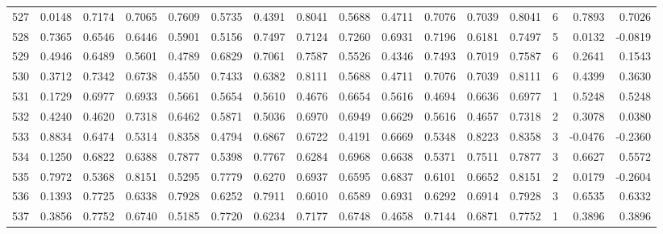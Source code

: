 \begin{tabular}{lrrrrrrrrrrrrrrr}
527 &      0.0148 &  0.7174 &  0.7065 &  0.7609 &  0.5735 &  0.4391 &  0.8041 &  0.5688 &  0.4711 &  0.7076 &   0.7039 &     0.8041 &      6 &                    0.7893 &                     0.7026 \\
528 &      0.7365 &  0.6546 &  0.6446 &  0.5901 &  0.5156 &  0.7497 &  0.7124 &  0.7260 &  0.6931 &  0.7196 &   0.6181 &     0.7497 &      5 &                    0.0132 &                    -0.0819 \\
529 &      0.4946 &  0.6489 &  0.5601 &  0.4789 &  0.6829 &  0.7061 &  0.7587 &  0.5526 &  0.4346 &  0.7493 &   0.7019 &     0.7587 &      6 &                    0.2641 &                     0.1543 \\
530 &      0.3712 &  0.7342 &  0.6738 &  0.4550 &  0.7433 &  0.6382 &  0.8111 &  0.5688 &  0.4711 &  0.7076 &   0.7039 &     0.8111 &      6 &                    0.4399 &                     0.3630 \\
531 &      0.1729 &  0.6977 &  0.6933 &  0.5661 &  0.5654 &  0.5610 &  0.4676 &  0.6654 &  0.5616 &  0.4694 &   0.6636 &     0.6977 &      1 &                    0.5248 &                     0.5248 \\
532 &      0.4240 &  0.4620 &  0.7318 &  0.6462 &  0.5871 &  0.5036 &  0.6970 &  0.6949 &  0.6629 &  0.5616 &   0.4657 &     0.7318 &      2 &                    0.3078 &                     0.0380 \\
533 &      0.8834 &  0.6474 &  0.5314 &  0.8358 &  0.4794 &  0.6867 &  0.6722 &  0.4191 &  0.6669 &  0.5348 &   0.8223 &     0.8358 &      3 &                   -0.0476 &                    -0.2360 \\
534 &      0.1250 &  0.6822 &  0.6388 &  0.7877 &  0.5398 &  0.7767 &  0.6284 &  0.6968 &  0.6638 &  0.5371 &   0.7511 &     0.7877 &      3 &                    0.6627 &                     0.5572 \\
535 &      0.7972 &  0.5368 &  0.8151 &  0.5295 &  0.7779 &  0.6270 &  0.6937 &  0.6595 &  0.6837 &  0.6101 &   0.6652 &     0.8151 &      2 &                    0.0179 &                    -0.2604 \\
536 &      0.1393 &  0.7725 &  0.6338 &  0.7928 &  0.6252 &  0.7911 &  0.6010 &  0.6589 &  0.6931 &  0.6292 &   0.6914 &     0.7928 &      3 &                    0.6535 &                     0.6332 \\
537 &      0.3856 &  0.7752 &  0.6740 &  0.5185 &  0.7720 &  0.6234 &  0.7177 &  0.6748 &  0.4658 &  0.7144 &   0.6871 &     0.7752 &      1 &                    0.3896 &                     0.3896 \\

\end{tabular}

